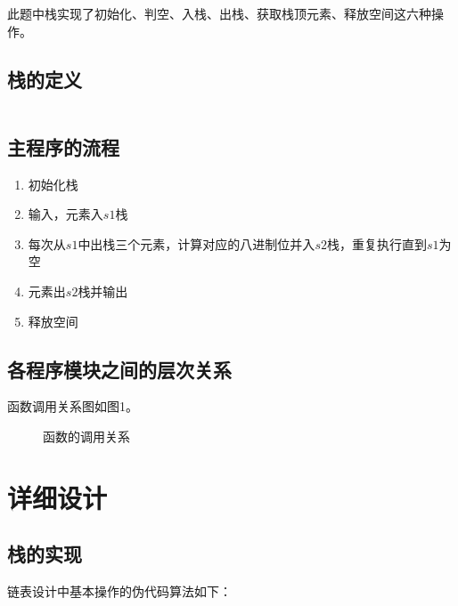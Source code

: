 \documentclass{article}
\begin{document}
此题中栈实现了初始化、判空、入栈、出栈、获取栈顶元素、释放空间这六种操作。

\subsection{栈的定义}

\begin{lstlisting}[language={C},
    numbers=left,
    numberstyle=\tiny\consolas,
    basicstyle=\small\consolas]
\end{lstlisting}

\subsection{主程序的流程}

\begin{enumerate}
    \item 初始化栈
    \item 输入，元素入$s1$栈
    \item 每次从$s1$中出栈三个元素，计算对应的八进制位并入$s2$栈，重复执行直到$s1$为空
    \item 元素出$s2$栈并输出
    \item 释放空间
\end{enumerate}

\subsection{各程序模块之间的层次关系}

函数调用关系图如图1。

\begin{figure}[htbp]
    
    
    \caption{函数的调用关系}
    
\end{figure}

\section{详细设计}

\subsection{栈的实现}

链表设计中基本操作的伪代码算法如下：
\begin{lstlisting}[language={C},
    numbers=left,
    numberstyle=\tiny\consolas,
    basicstyle=\small\consolas]
\end{lstlisting}
\end{document}
